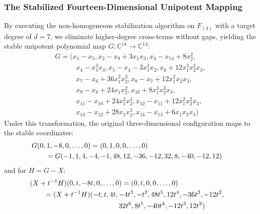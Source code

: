 \documentclass[11pt,a4paper]{article}
\begin{document}
\subsubsection{The Stabilized Fourteen-Dimensional Unipotent Mapping}
By executing the non-homogeneous stabilization algorithm on $F_{(3)}$ with a target degree of $d=7$, we eliminate higher-degree cross-terms without gaps, yielding the stable unipotent polynomial map $G: \mathbb{C}^{14} \to \mathbb{C}^{14}$:
\begin{gather*}
G = \big(x_1-x_5, x_2-x_9+3x_1x_3, x_3-x_{14}+8x_2^2, \\
\qquad\quad x_4-x_1^3x_3, x_5-x_4-3x_1^2x_2, x_6+12x_1^3x_2^2x_3, \\
\qquad\quad x_7-x_6+36x_1^2x_2^3, x_8-x_7+12x_1^2x_2x_3, \\
\qquad\quad x_9-x_8+24x_1x_2^2, x_{10}+8x_1^3x_2^3x_3, \\
\qquad\quad x_{11}-x_{10}+24x_1^2x_2^4, x_{12}-x_{11}+12x_1^2x_2^2x_3, \\
\qquad\quad x_{13}-x_{12}+28x_1x_2^3, x_{14}-x_{13}+6x_1x_2x_3\big)
\end{gather*}
Under this transformation, the original three-dimensional configuration maps to the stable coordinates:
\begin{align*}
\lefteqn{G(0,1,-8,0,\ldots,0) = (0,1,0,0,\ldots,0)} \\
&\qquad= G(-1,1,4,-4,-1,48,12,-36,-12,32,8,-40,-12,12)
\end{align*}
and for $H = G - X$:
\begin{align*}
\lefteqn{(X + t^{-1}H)(0,t,-8t,0,\ldots,0) = (0,t,0,0,\ldots,0)} \\
&\qquad= (X + t^{-1}H)(-t,t,4t,-4t^3,-t^2,48t^5,12t^4,-36t^3,-12t^2, \\
&\qquad\hphantom{{}= (X + t^{-1}H)(-t,t,4t,{}}32t^6,8t^5,-40t^4,-12t^3,12t^2)
\end{align*}
\end{document}
